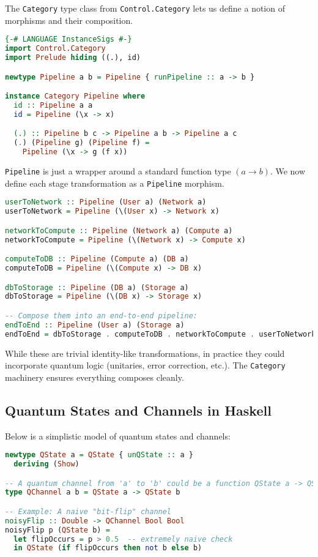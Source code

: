 \documentclass[12pt]{article}
\begin{document}
The \texttt{Category} type class from \texttt{Control.Category}
lets us define a notion of morphisms and their composition.

\begin{lstlisting}[language=Haskell,caption={A custom Pipeline newtype for composition.},float]
{-# LANGUAGE InstanceSigs #-}
import Control.Category
import Prelude hiding ((.), id)

newtype Pipeline a b = Pipeline { runPipeline :: a -> b }

instance Category Pipeline where
  id :: Pipeline a a
  id = Pipeline (\x -> x)

  (.) :: Pipeline b c -> Pipeline a b -> Pipeline a c
  (.) (Pipeline g) (Pipeline f) =
    Pipeline (\x -> g (f x))
\end{lstlisting}

\texttt{Pipeline} is just a wrapper around a standard function type
\((a \to b)\). We now define each stage transformation as a
\texttt{Pipeline} morphism.

\begin{lstlisting}[language=Haskell,caption={Sample transitions between stages.},float]
userToNetwork :: Pipeline (User a) (Network a)
userToNetwork = Pipeline (\(User x) -> Network x)

networkToCompute :: Pipeline (Network a) (Compute a)
networkToCompute = Pipeline (\(Network x) -> Compute x)

computeToDB :: Pipeline (Compute a) (DB a)
computeToDB = Pipeline (\(Compute x) -> DB x)

dbToStorage :: Pipeline (DB a) (Storage a)
dbToStorage = Pipeline (\(DB x) -> Storage x)

-- Compose them into an end-to-end pipeline:
endToEnd :: Pipeline (User a) (Storage a)
endToEnd = dbToStorage . computeToDB . networkToCompute . userToNetwork
\end{lstlisting}

While these are trivial identity-like transformations, in practice
they could incorporate quantum logic (unitaries, error correction,
etc.). The \texttt{Category} machinery ensures everything composes
cleanly.

\subsection{Quantum States and Channels in Haskell}

Below is a simplistic model of quantum states and channels:

\begin{lstlisting}[language=Haskell,caption={A toy model of quantum states/channels.},float]
newtype QState a = QState { unQState :: a }
  deriving (Show)

-- A quantum channel from 'a' to 'b' could be a function QState a -> QState b
type QChannel a b = QState a -> QState b

-- Example: A naive "bit-flip" channel
noisyFlip :: Double -> QChannel Bool Bool
noisyFlip p (QState b) =
  let flipOccurs = p > 0.5  -- extremely naive check
  in QState (if flipOccurs then not b else b)
\end{lstlisting}
\end{document}
